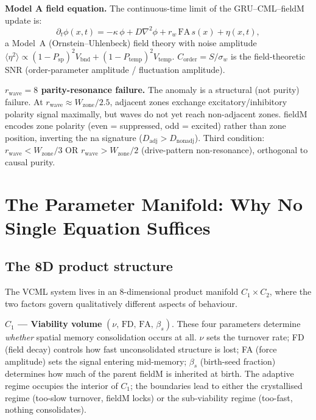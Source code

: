 \documentclass[11pt]{article}
\begin{document}
\textbf{Model A field equation.}
The continuous-time limit of the GRU--CML--fieldM update is:
\begin{equation*}
  \partial_t \phi(x,t)
  = -\kappa\,\phi + D\nabla^2\phi + r_w\,\mathrm{FA}\,s(x) + \eta(x,t),
\end{equation*}
a Model~A (Ornstein--Uhlenbeck) field theory with noise amplitude
$\langle\eta^2\rangle \propto (1-P_\text{sp})^2 V_\text{bnd} + (1-P_\text{temp})^2 V_\text{temp}$.
$C_\text{order} = S/\sigma_w$ is the field-theoretic SNR
(order-parameter amplitude / fluctuation amplitude).

\textbf{$r_\mathrm{wave}=8$ parity-resonance failure.}
The anomaly is a structural (not purity) failure.
At $r_\mathrm{wave} \approx W_\mathrm{zone}/2.5$, adjacent zones exchange
excitatory/inhibitory polarity signal maximally, but waves do not yet reach
non-adjacent zones.
fieldM encodes zone polarity (even = suppressed, odd = excited) rather than
zone position, inverting the na signature ($D_\text{adj} > D_\text{nonadj}$).
Third condition: $r_\mathrm{wave} < W_\mathrm{zone}/3$ OR $r_\mathrm{wave} > W_\mathrm{zone}/2$
(drive-pattern non-resonance), orthogonal to causal purity.

\section{The Parameter Manifold: Why No Single Equation Suffices}
\label{sec:manifold}

\subsection{The 8D product structure}

The VCML system lives in an 8-dimensional product manifold $C_1 \times C_2$,
where the two factors govern qualitatively different aspects of behaviour.

\medskip
\textbf{$C_1$ --- Viability volume} $(\nu,\, \mathrm{FD},\, \mathrm{FA},\, \beta_s)$.
These four parameters determine \emph{whether} spatial memory consolidation occurs at all.
$\nu$ sets the turnover rate; FD (field decay) controls how fast unconsolidated
structure is lost; FA (force amplitude) sets the signal entering mid-memory;
$\beta_s$ (birth-seed fraction) determines how much of the parent fieldM is
inherited at birth.
The adaptive regime occupies the interior of $C_1$; the boundaries lead to either
the crystallised regime (too-slow turnover, fieldM locks) or the sub-viability
regime (too-fast, nothing consolidates).
\end{document}

